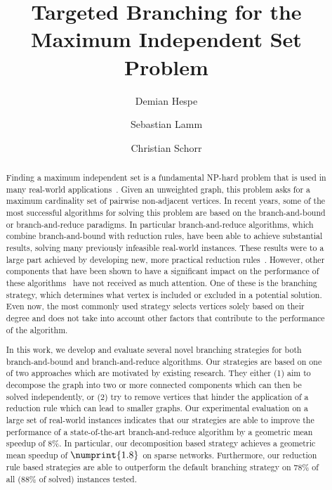 \documentclass[a4paper,UKenglish,cleveref, autoref, thm-restate]{lipics-v2021}
\title{Targeted Branching for the Maximum Independent Set Problem} %
\author{Demian Hespe}{Karlsruhe Institute of Technology, Institute for
  Theoretical Informatics,
  Germany}{hespe@kit.edu}{https://orcid.org/0000-0001-6232-2951}{\todo{Add
    funding}}
\author{Sebastian Lamm}{Karlsruhe Institute of Technology, Institute for
  Theoretical Informatics, Germany}{lamm@kit.edu}{}{\todo{Add funding}}
\author{Christian Schorr}{Karlsruhe Institute of Technology, Institute for
  Theoretical Informatics, Germany}{christian.schorr@student.kit.edu}{}{}
\begin{document}
\maketitle

\begin{abstract}
  Finding a maximum independent set is a fundamental NP-hard problem that is used in many real-world applications~\cite{BIO1,BIO2,RP,NW,CG}.
Given an unweighted graph, this problem asks for a maximum cardinality set of pairwise non-adjacent vertices.
In recent years, some of the most successful algorithms for solving this problem are based on the branch-and-bound or branch-and-reduce paradigms.
In particular branch-and-reduce algorithms, which combine branch-and-bound with reduction rules, have been able to achieve substantial results, solving many previously infeasible real-world instances.
These results were to a large part achieved by developing new, more practical reduction rules~\cite{alsahafy2020computing,ChangKern,dahlum2016accelerating,hespe2019scalable}.
However, other components that have been shown to have a significant impact on the performance of these algorithms~\cite{AkibaIwata} have not received as much attention.
One of these is the branching strategy, which determines what vertex is included or excluded in a potential solution.
Even now, the most commonly used strategy selects vertices solely based on their degree and does not take into account other factors that contribute to the performance of the algorithm.

In this work, we develop and evaluate several novel branching strategies for both branch-and-bound and branch-and-reduce algorithms.
Our strategies are based on one of two approaches which are motivated by existing research. 
They either (1) aim to decompose the graph into two or more connected components which can then be solved independently, or (2) try to remove vertices that hinder the application of a reduction rule which can lead to smaller graphs.
Our experimental evaluation on a large set of real-world instances indicates
that our strategies are able to improve the performance of a state-of-the-art
branch-and-reduce algorithm by a geometric mean speedup of $8\%$. In particular, our
decomposition based strategy achieves a geometric mean speedup of $\numprint{1.8}$ on sparse networks.
Furthermore, our reduction rule based strategies are able to outperform the
default branching strategy on $78\%$ of all
($88\%$ of solved)
instances tested.

\end{abstract}
\end{document}
